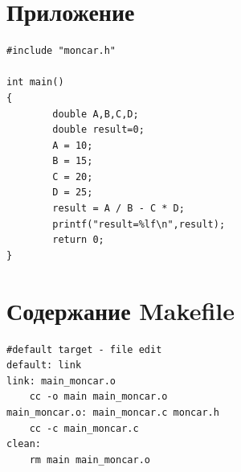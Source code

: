 \documentclass[a4paper,14pt]{extarticle}
\begin{document}
\section{Приложение}
\begin{verbatim}
#include "moncar.h"

int main()
{
        double A,B,C,D;
        double result=0;
        A = 10;
        B = 15;
        C = 20;
        D = 25;
        result = A / B - C * D;
        printf("result=%lf\n",result);
        return 0;
}
\end{verbatim}
\section{Содержание Makefile}
\begin{verbatim}
#default target - file edit
default: link
link: main_moncar.o
	cc -o main main_moncar.o
main_moncar.o: main_moncar.c moncar.h
	cc -c main_moncar.c
clean:
	rm main main_moncar.o
\end{verbatim}




%
%    
\end{document}
